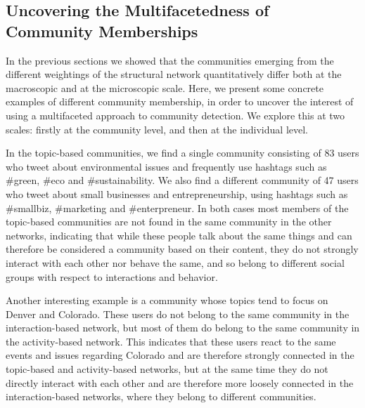 \subsection{Uncovering the Multifacetedness of Community Memberships}


In the previous sections we showed that the communities emerging from the different weightings of the structural network quantitatively differ both at the macroscopic and at the microscopic scale. Here, we present some concrete examples of different community membership, in order to uncover the interest of using a multifaceted approach to community detection. We explore this at two scales: firstly at the community level, and then at the individual level.

In the topic-based communities, we find a single community consisting of 83 users who tweet about environmental issues and frequently use hashtags such as \#green, \#eco and \#sustainability. We also find a different community of 47 users who tweet about small businesses and entrepreneurship, using hashtags such as \#smallbiz, \#marketing and \#enterpreneur. In both cases most members of the topic-based communities are not found in the same community in the other networks, indicating that while these people talk about the same things and can therefore be considered a community based on their content, they do not strongly interact with each other nor behave the same, and so belong to different social groups with respect to interactions and behavior.

Another interesting example is a community whose topics tend to focus on Denver and Colorado. These users do not belong to the same community in the interaction-based network, but most of them do belong to the same community in the activity-based network. This indicates that these users react to the same events and issues regarding Colorado and are therefore strongly connected in the topic-based and activity-based networks, but at the same time they do not directly interact with each other and are therefore more loosely connected in the interaction-based networks, where they belong to different communities.

